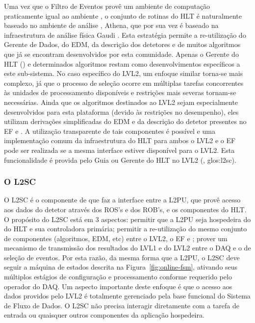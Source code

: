 Uma vez que o Filtro de Eventos provê um ambiente de computação praticamente
igual ao ambiente , o conjunto de rotinas do HLT é naturalmente
baseado no ambiente de análise , Athena, que por sua vez é
baseado na infraestrutura de análise física Gaudi \cite{athena:home-page,
athena:devel-guide}. Esta estratégia permite a re-utilização do Gerente de
Dados, do EDM, da descrição dos detetores e de muitos algoritmos que já se
encontram desenvolvidos por esta comunidade. Apenas o Gerente do HLT
() e determinados algoritmos restam como desenvolvimentos
específicos a este sub-sistema. No caso específico do LVL2, um enfoque similar
torna-se mais complexo, já que o processo de seleção ocorre em múltiplas
tarefas concorrentes às unidades de processamento disponíveis e restrições
mais severas tornam-se necessárias. Ainda que os algoritmos destinados ao LVL2
sejam especialmente desenvolvidos para esta plataforma (devido às restrições
no desempenho), eles utilizam derivações simplificadas do EDM e da descrição
do detetor presentes no EF e . A utilização transparente de tais
componentes é possível e uma implementação comum da infraestrutura do HLT para
ambos o LVL2 e o EF pode ser realizada se a mesma interface estiver disponível
para o LVL2. Esta funcionalidade é provida pelo Guia ou Gerente do HLT no LVL2
(, \gls{glos:l2sc}).

\subsubsection{O L2SC}

O L2SC é o componente de  que faz a interface entre a L2PU, que
provê acesso aos dados do detetor através dos ROS's e dos ROB's, e os
componentes do HLT. O propósito do L2SC está em 3 aspectos: permitir que a
L2PU seja hospedeira do  do HLT e sua controladora primária;
permitir a re-utilização do mesmo conjunto de componentes (algoritmos, EDM,
etc) entre o LVL2, o EF e ; prover um mecanismo de transmissão
dos resultados do LVL1 e do LVL2 entre o DAQ e o  de seleção de
eventos. Por esta razão, da mesma forma que a L2PU, o L2SC deve seguir a
máquina de estados descrita na Figura~\ref{fig:online-fsm}, ativando seus
múltiplos estágios de configuração e processamento conforme requerido pelo
operador do DAQ. Um aspecto importante deste enfoque é que o acesso aos dados
providos pelo LVL2 é totalmente gerenciado pela base funcional do Sistema de
Fluxo de Dados. O L2SC não precisa interagir diretamente com a tarefa de
entrada ou quaisquer outros componentes da aplicação hospedeira.

